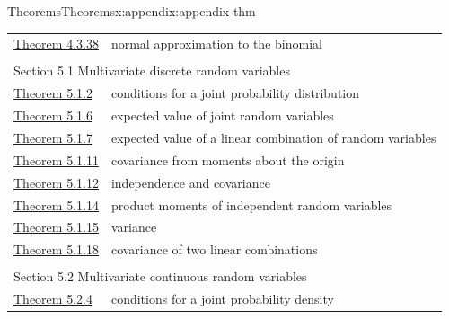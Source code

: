 \documentclass[oneside,10pt,]{book}
\numberwithin{equation}{section}
\begin{document}
\begin{appendixptx}{Theorems}{}{Theorems}{}{}{x:appendix:appendix-thm}
\begin{longtable}[l]{ll}
\hyperref[x:theorem:thm-cont-normal-binom]{Theorem 4.3.38}& normal approximation to the binomial\\
\multicolumn{2}{l}{\null}\\[1.5ex] \multicolumn{2}{l}{\large Section 5.1 Multivariate discrete random variables}\\[0.5ex]
\hyperref[x:theorem:thm-3-7]{Theorem 5.1.2}& conditions for a joint probability distribution\\
\hyperref[x:theorem:thm-expected-value-joint-random-variables-4-4]{Theorem 5.1.6}& expected value of joint random variables\\
\hyperref[x:theorem:thm-4-5]{Theorem 5.1.7}& expected value of a linear combination of random variables\\
\hyperref[x:theorem:thm-4-11]{Theorem 5.1.11}& covariance from moments about the origin\\
\hyperref[x:theorem:thm-4-12]{Theorem 5.1.12}& independence and covariance\\
\hyperref[x:theorem:thm-4-13]{Theorem 5.1.14}& product moments of independent random variables\\
\hyperref[x:theorem:thm-4-14]{Theorem 5.1.15}& variance\\
\hyperref[x:theorem:thm-4-15]{Theorem 5.1.18}& covariance of two linear combinations\\
\multicolumn{2}{l}{\null}\\[1.5ex] \multicolumn{2}{l}{\large Section 5.2 Multivariate continuous random variables}\\[0.5ex]
\hyperref[x:theorem:thm-continuous-th-3-7-cont]{Theorem 5.2.4}& conditions for a joint probability density\\
\end{longtable}
\end{appendixptx}
%
%
\typeout{************************************************}
\typeout{************************************************}
%
\end{document}
